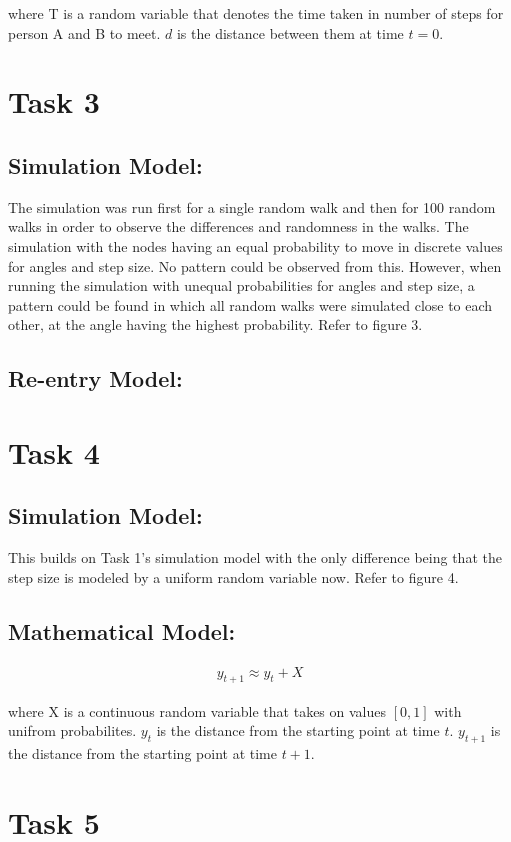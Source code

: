 \documentclass[8pt]{extarticle}
\begin{document}
where T is a random variable that denotes the time taken in number of steps for person A and B to meet.
$d$ is the distance between them at time $t = 0$.


\section*{Task 3}
\subsection*{Simulation Model:}
The simulation was run first for a single random walk and then for 100 random walks in order to observe the differences and randomness in the walks. The simulation with the nodes having an equal probability to move in discrete values for angles and step size. No pattern could be observed from this. However, when running the simulation with unequal probabilities for angles and step size, a pattern could be found in which all random walks were simulated close to each other, at the angle having the highest probability.
Refer to figure 3.

\subsection*{Re-entry Model:}


\section*{Task 4}
\subsection*{Simulation Model:}
This builds on Task 1's simulation model with the only difference being that the step size is modeled by a uniform random variable now.
Refer to figure 4.

\subsection*{Mathematical Model:}
\begin{align*}
    y_{t+1} \approx y_{t} + X
\end{align*}

where X is a continuous random variable that takes on values $[0, 1]$ with unifrom probabilites.
$y_t$ is the distance from the starting point at time $t$. $y_{t+1}$ is the distance from the starting point at time $t+1$.


\section*{Task 5}
\end{document}
